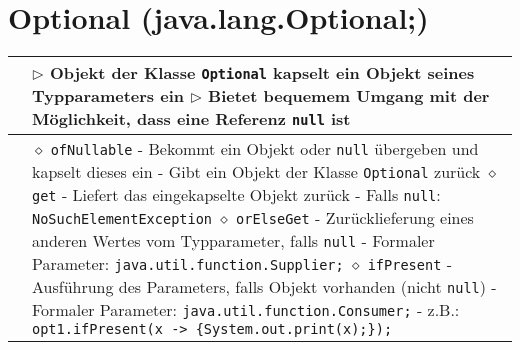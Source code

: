 \section{Optional (java.lang.Optional;)}
	\begin{tabular}{ | p{} p{} | }
	\hline
	
	\makecell[l]{Informationen} & \makecell[l]{
	$\rhd$ Objekt der Klasse \texttt{Optional} kapselt ein Objekt seines Typparameters ein \\
	$\rhd$ Bietet bequemem Umgang mit der Möglichkeit, dass eine Referenz \texttt{null} ist } \\ \hline

	\makecell[l]{Methoden} & \makecell[l]{
	\hspace{0.4cm} $\diamond$ \texttt{ofNullable} \\
	\hspace{0.6cm} - Bekommt ein Objekt oder \texttt{null} übergeben und kapselt dieses ein \\
	\hspace{0.6cm} - Gibt ein Objekt der Klasse \texttt{Optional} zurück \\
	\hspace{0.4cm} $\diamond$ \texttt{get} \\
	\hspace{0.6cm} - Liefert das eingekapselte Objekt zurück \\
	\hspace{0.6cm} - Falls \texttt{null}: \texttt{NoSuchElementException} \\
	\hspace{0.4cm} $\diamond$ \texttt{orElseGet} \\
	\hspace{0.6cm} - Zurücklieferung eines anderen Wertes vom Typparameter, falls \texttt{null} \\
	\hspace{0.6cm} - Formaler Parameter: \texttt{java.util.function.Supplier;} \\
	\hspace{0.4cm} $\diamond$ \texttt{ifPresent} \\
	\hspace{0.6cm} - Ausführung des Parameters, falls Objekt vorhanden (nicht \texttt{null}) \\
	\hspace{0.6cm} - Formaler Parameter: \texttt{java.util.function.Consumer;} \\
	\hspace{0.6cm} - z.B.: \texttt{opt1.ifPresent(x -> \{System.out.print(x);\});} \\
}
\end{tabular}
